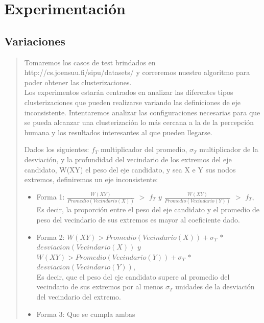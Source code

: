 \documentclass[12pt,a4paper]{article}
\begin{document}
\section{Experimentación}
\subsection{Variaciones}
\begin{verse}
Tomaremos los casos de test brindados en http://cs.joensuu.fi/sipu/datasets/ y correremos nuestro algoritmo para poder obtener las clusterizaciones.\\
Los experimentos estarán centrados en analizar las diferentes tipos clusterizaciones que pueden realizarse variando las definiciones de eje inconsistente. Intentaremos analizar las configuraciones necesarias para que se pueda alcanzar una clusterización lo más cercana a la de la percepción humana y los resultados interesantes al que pueden llegarse.

Dados los siguientes: $f_{T}$ multiplicador del promedio, $\sigma_{T}$ multiplicador de la desviación, y la profundidad del vecindario de los extremos del eje candidato, W(XY) el peso del eje candidato, y sea X e Y sus nodos extremos, definiremos un eje inconsistente:
\begin{itemize}
\item Forma 1: $\frac{W(XY)}{Promedio(Vecindario(X))}$ $>$ $f_{T}$ $  y $ $\frac{W(XY)}{Promedio(Vecindario(Y))}$ $>$ $f_{T}$, \\Es decir, la proporción entre el peso del eje candidato y el promedio de peso del vecindario de sus extremos es mayor al coeficiente dado.
\item Forma 2: $W(XY) >  Promedio(Vecindario(X)) + \sigma_{T}$ $ * $ $ desviacion(Vecindario(X)) $ $ y$ $W(XY) >  Promedio(Vecindario(Y)) + \sigma_{T}$ $ * $ $ desviacion(Vecindario(Y)) $, \\Es decir, que el peso del eje candidato supere al promedio del vecindario de sus extremos por al menos $\sigma_{T}$ unidades de la desviación del vecindario del extremo.
\item Forma 3: Que se cumpla ambas
\end{itemize}



\end{verse}
\end{document}
